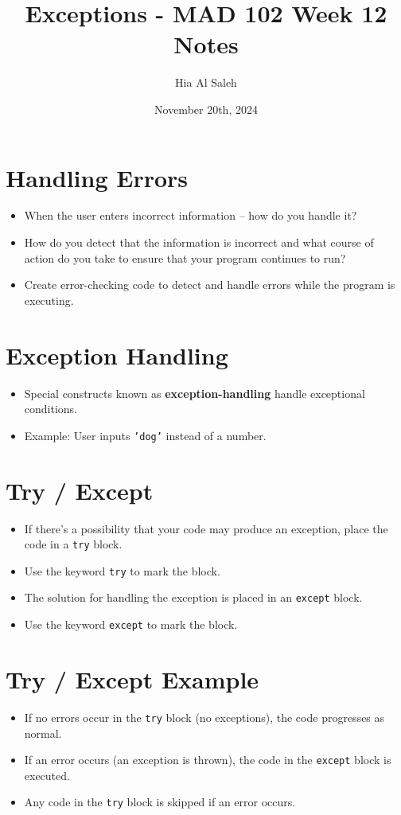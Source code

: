 \documentclass{article}
\title{Exceptions - MAD 102 Week 12 Notes}
\author{Hia Al Saleh}
\date{November 20th, 2024}
\begin{document}
\maketitle
\tableofcontents
\newpage

\section{Handling Errors}
\begin{itemize}
    \item When the user enters incorrect information – how do you handle it?
    \item How do you detect that the information is incorrect and what course of action do you take to ensure that your program continues to run?
    \item Create error-checking code to detect and handle errors while the program is executing.
\end{itemize}

\section{Exception Handling}
\begin{itemize}
    \item Special constructs known as \textbf{exception-handling} handle exceptional conditions.
    \item Example: User inputs \texttt{'dog'} instead of a number.
\end{itemize}

\section{Try / Except}
\begin{itemize}
    \item If there's a possibility that your code may produce an exception, place the code in a \texttt{try} block.
    \item Use the keyword \texttt{try} to mark the block.
    \item The solution for handling the exception is placed in an \texttt{except} block.
    \item Use the keyword \texttt{except} to mark the block.
\end{itemize}

\section{Try / Except Example}
\begin{itemize}
    \item If no errors occur in the \texttt{try} block (no exceptions), the code progresses as normal.
    \item If an error occurs (an exception is thrown), the code in the \texttt{except} block is executed.
    \item Any code in the \texttt{try} block is skipped if an error occurs.
\end{itemize}
\end{document}
